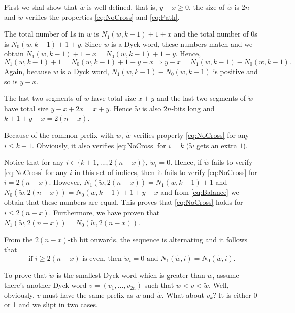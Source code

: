 \documentclass[a4paper]{article}
\begin{document}
First we shal show that $\tilde w$ is well defined, that is, $y - x \ge 0$, the size of $\tilde w$ is $2n$ and $\tilde w$ verifies the properties \eqref{eq:NoCross} and \eqref{eq:Path}.

The total number of 1s in $w$ is $N_1(w, k - 1) + 1 + x$ and the total number of 0s is $N_0(w, k - 1) + 1 + y$.
Since $w$ is a Dyck word, these numbers match and we obtain $N_1(w, k - 1) + 1 + x = N_0(w, k - 1) + 1 + y$.
Hence,
\begin{equation}
\label{eq:Balance}
N_1(w, k - 1) + 1 = N_0(w, k - 1) + 1 + y - x \Longrightarrow y - x = N_1(w, k - 1) - N_0(w, k - 1).
\end{equation}
Again, because $w$ is a Dyck word, $N_1(w, k - 1) - N_0(w, k - 1)$ is positive and so is $y - x$.

The last two segments of $w$ have total size $x + y$ and the last two segments of $\tilde w$ have total size $y - x + 2 x = x + y$.
Hence $\tilde w$ is also $2n$-bits long and $k + 1 + y - x = 2(n - x)$.

Because of the common prefix with $w$, $\tilde w$ verifies property \eqref{eq:NoCross} for any $i \le k - 1$.
Obviously, it also verifies \eqref{eq:NoCross} for $i = k$ ($\tilde w$ gets an extra $1$).

Notice that for any $i\in\{k + 1, ..., 2(n - x)\}$, $\tilde w_i = 0$.
Hence, if $\tilde w$ fails to verify \eqref{eq:NoCross} for any $i$ in this set of indices, then it fails to verify \eqref{eq:NoCross} for $i = 2(n - x)$.
However, $N_1(\tilde w, 2(n - x)) = N_1(w, k - 1) + 1$ and $N_0(\tilde w, 2(n - x)) = N_0(w, k - 1) + 1 + y - x$ and from \eqref{eq:Balance} we obtain that these numbers are equal.
This proves that \eqref{eq:NoCross} holds for $i \le 2(n - x)$.
Furthermore, we have proven that $N_1(\tilde w, 2(n - x)) = N_0(\tilde w, 2(n - x))$.

From the $2(n - x)$-th bit onwards, the sequence is alternating and it follows that
\begin{equation}
\label{eq:Alternating}
\text{if } i \ge 2(n - x) \text{ is even, then }\tilde w_i = 0 \text{ and } N_1(\tilde w, i) = N_0(\tilde w, i).
\end{equation}

To prove that $\tilde w$ is the smallest Dyck word which is greater than $w$, assume there's another Dyck word $v = (v_1, ..., v_{2n})$ such that $w < v < \tilde w$.
Well, obviously, $v$ must have the same prefix as $w$ and $\tilde w$.
What about $v_k$?
It is either 0 or 1 and we slipt in two cases.
\end{document}
